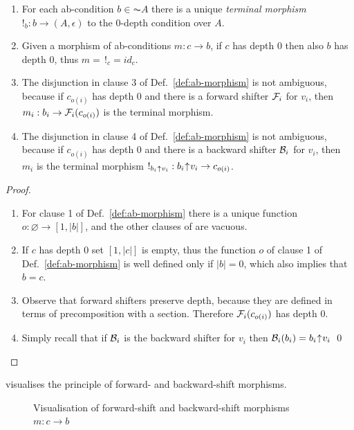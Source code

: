 \begin{lemma}
\begin{enumerate}
\item
For each ab-condition $b \in \AC{A}$ there is a unique \emph{terminal morphism} $!_b: b \to (A,\epsilon)$ to the 0-depth condition over $A$. 
\item 
Given a morphism of ab-conditions $m:c \to b$, if $c$ has depth 0 then also $b$ has depth 0, thus $m =\, !_c = id_c$. 
\item 
The disjunction in clause 3  of Def.~\ref{def:ab-morphism} is not ambiguous, because if $c_{o(i)}$ has depth 0 and there is a forward shifter $\mathcal{F}_i$ for $v_i$,  then 
$m_i: b_i \rightarrow \mathcal{F}_i(c_{o(i)})$ is the terminal morphism.
\item 
The disjunction in clause 4  of Def.~\ref{def:ab-morphism} is not ambiguous, because if $c_{o(i)}$ has depth 0 and there is a backward shifter $\mathcal{B}_i$ for $v_i$, then $m_i$ is the terminal morphism $!_{{b_i}{\mskip1mu\uparrow\mskip1mu}{v_i}}: {b_i}{\mskip1mu\uparrow\mskip1mu}{v_i} \rightarrow c_{o(i)}$.
\end{enumerate}
\end{lemma}


\begin{proof}
\begin{enumerate}
  \item For clause 1 of Def.~\ref{def:ab-morphism} there is a unique function $o: \varnothing \to [1,|b|]$, and the other clauses of are vacuous.
  \item If $c$ has depth 0 set $[1, |c|]$ is empty, thus the function $o$ of clause 1 of Def.~\ref{def:ab-morphism} is well defined only if $|b| = 0$, which also implies that $b=c$.
  \item Observe that forward shifters preserve depth, because they are defined in terms of precomposition  with a section. Therefore $\mathcal{F}_i(c_{o(i)})$ has depth 0.
\item  Simply recall that if $\mathcal{B}_i$ is the backward shifter for $v_i$ then $\mathcal{B}_i(b_i) = {b_i}{\mskip1mu\uparrow\mskip1mu}{v_i}$ \qed 
\end{enumerate}
\end{proof}
%
 visualises the principle of forward- and backward-shift morphisms.
%
\begin{figure}[t]
\centering

\caption{Visualisation of forward-shift and backward-shift morphisms $m:c \to b$}
\end{figure}

